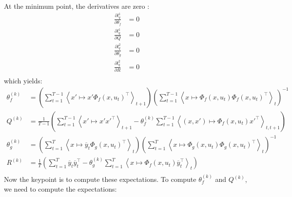 At the minimum point, the derivatives are zero :
\begin{align*}
  \frac{\partial l^1_q}{\partial \theta_f} &= 0 \\
  \frac{\partial l^1_q}{\partial Q} &= 0 \\
  \frac{\partial l^2_q}{\partial \theta_g} &= 0 \\
  \frac{\partial l^2_q}{\partial R} &= 0 \\
\end{align*}
which yields:
\begin{align*}
  \theta_f^{(k)} &=
    \left(
      \sum_{t=1}^{T-1}{\left< x' \mapsto x' \Phi_f(x,u_t)^{\top} \right>_{t+1}}
    \right)
    \left(
      \sum_{t=1}^{T-1}{\left< x \mapsto \Phi_f(x, u_t)\Phi_f(x,u_t)^{\top} \right>_{t}}
    \right)^{-1}
  \\
  Q^{(k)} &=
    \frac{1}{T-1}
    \left(
      \sum_{t=1}^{T-1}{\left< x' \mapsto x'x'^{\top} \right>_{t+1}} -
      \theta_f^{(k)} \sum_{t=1}^{T-1}{\left< (x,x') \mapsto \Phi_f(x, u_t) x'^{\top} \right>_{t,t+1}}
    \right)
  \\
  \theta_g^{(k)} &=
    \left(
      \sum_{t=1}^{T}{\left< x \mapsto \overline{y}_{t}\Phi_g(x,u_t)^{\top} \right>_{t}}
    \right)
    \left(
      \sum_{t=1}^{T}{\left< x \mapsto \Phi_g(x,u_t)\Phi_g(x,u_t)^{\top} \right>_{t}}
    \right)^{-1}
  \\
  R^{(k)} &=
    \frac{1}{T}
    \left(
      \sum_{t=1}^{T}{\overline{y}_t \overline{y}_t^{\top}} -
      \theta_g^{(k)} \sum_{t=1}^{T}{\left< x \mapsto \Phi_f(x, u_t) \overline{y}_t^{\top} \right>_{t}}
    \right)
  \\
\end{align*}
Now the keypoint is to compute these expectations.
To compute $\theta_f^{(k)}$ and $Q^{(k)}$, we need to compute the expectations:

